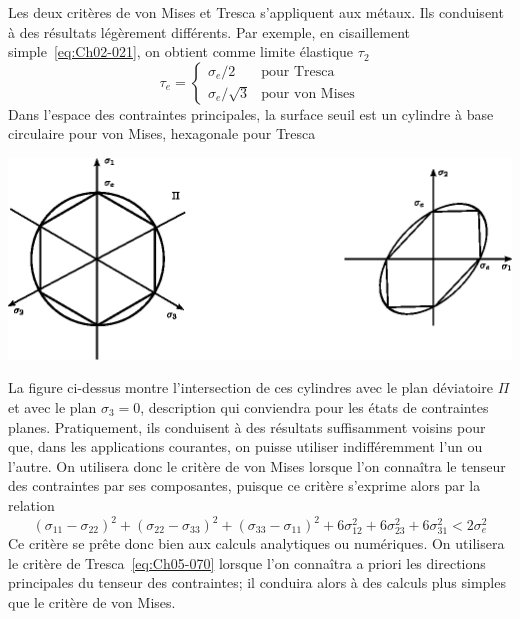 Les deux critères de von Mises et Tresca s'appliquent aux métaux.
Ils conduisent à des résultats légèrement différents.
Par exemple, en cisaillement simple~\eqref{eq:Ch02-021}, on obtient comme limite élastique $\tau_2$
\begin{equation}
    \tau_e = 
    \begin{cases}
        \sigma_e /2 & \text{pour Tresca} \\
        \sigma_e /\sqrt{3} & \text{pour von Mises}
    \end{cases}
    \label{eq:Ch05-071}
\end{equation}
Dans l'espace des contraintes principales, la surface seuil est un cylindre à base circulaire pour von Mises, hexagonale pour Tresca 
\begin{center}
    \includegraphics{../images/T1_Ch05-06}
\end{center}
La figure ci-dessus montre l'intersection de ces cylindres avec le plan déviatoire $\Pi$ et avec le plan $\sigma_3=0$, description qui conviendra pour les états de contraintes planes.
Pratiquement, ils conduisent à des résultats suffisamment voisins pour que, dans les applications courantes, on puisse utiliser indifféremment l'un ou l'autre.
On utilisera donc le critère de von Mises lorsque l'on connaîtra le tenseur des contraintes par ses composantes, puisque ce critère s'exprime alors par la relation 
\begin{equation}
    \left( \sigma_{11} - \sigma_{22} \right)^2 + \left( \sigma_{22} - \sigma_{33} \right)^2 + \left( \sigma_{33} - \sigma_{11} \right)^2 + 6\sigma_{12}^2 + 6 \sigma_{23}^2 + 6\sigma_{31}^2 < 2 \sigma_e^2
    \label{eq:Ch05-072}
\end{equation}
Ce critère se prête donc bien aux calculs analytiques ou numériques.
On utilisera le critère de Tresca~\eqref{eq:Ch05-070} lorsque l'on connaîtra a priori les directions principales du tenseur des contraintes; il conduira alors à des calculs plus simples que le critère de von Mises. 
